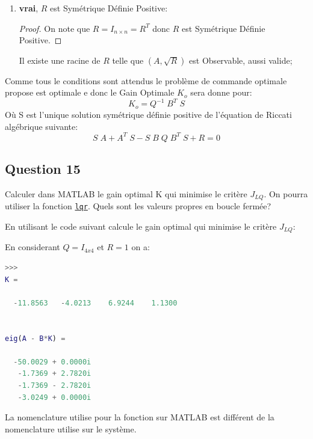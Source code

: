 \documentclass[class=article, crop=false]{standalone}
\begin{document}
\begin{resolution}
\begin{enumerate}[rightmargin = \leftmargin]
        \item \textbf{vrai}, $R$ est Symétrique Définie Positive:
        \begin{proof}
            On note que $R = I_{n\times n} = R^T$ donc $R$ est Symétrique Définie Positive. 
        \end{proof}
        \begin{remark}
            Il existe une racine de $R$ telle que $(A, \sqrt{R})$ est Observable, aussi valide;
        \end{remark}
    \end{enumerate}
    Comme tous le conditions sont attendus le problème de commande optimale propose est optimale e donc le Gain Optimale $K_o$ sera donne pour:
    \begin{equation}
        \boxed{
            K_o = Q^{-1} \; B^T \; S
        }
    \end{equation}
    Où S est l'unique solution symétrique définie positive de l'équation de Riccati algébrique suivante:
    \begin{equation}
        S \; A + A^T \; S - S \; B \; Q \; B^T \; S + R = 0 
    \end{equation}

\end{resolution}

\newpage
\subsection{Question 15}
\begin{exercise}
    Calculer dans MATLAB le gain optimal K qui minimise le critère $J_{LQ}$. On pourra utiliser la fonction \href{https://www.mathworks.com/help/control/ref/lti.lqr.html}{\texttt{lqr}}. Quels sont les valeurs propres en boucle fermée?
\end{exercise}
\begin{resolution}
    En utilisant le code suivant calcule le gain optimal qui minimise le critère $J_{LQ}$:
    \begin{scriptsize}\mycode
        
    \end{scriptsize}
    En considerant $Q = I_{4x4}$ et $R = 1$ on a:
    \begin{scriptsize}\mycode
        \begin{lstlisting}[language=Matlab]
>>>
K =

  -11.8563   -4.0213    6.9244    1.1300


eig(A - B*K) =

  -50.0029 + 0.0000i
   -1.7369 + 2.7820i
   -1.7369 - 2.7820i
   -3.0249 + 0.0000i
        \end{lstlisting}
    \end{scriptsize}
    \begin{remark}
        La nomenclature utilise pour la fonction sur MATLAB est différent de la nomenclature utilise sur le système.
    \end{remark}
\end{resolution}
\end{document}
